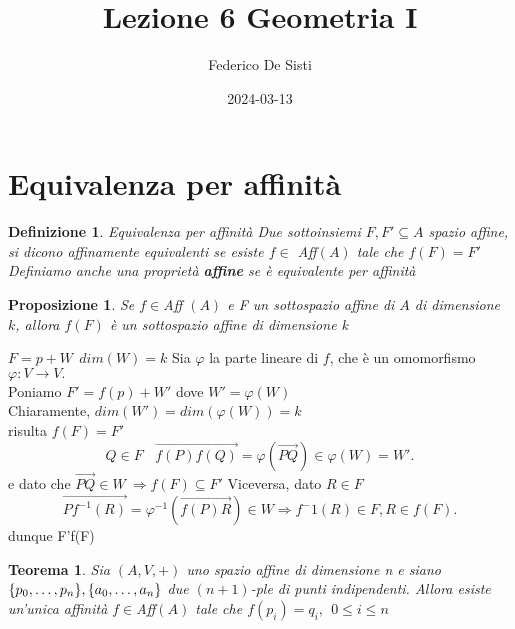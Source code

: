 \documentclass[12px]{article}
\title{Lezione 6 Geometria I}
\date{2024-03-13}
\author{Federico De Sisti}
\theoremstyle{break}
\newtheorem{theo}{Teorema}
\theoremstyle{break}
\theoremstyle{break}
\newtheorem{defin}{Definizione}
\theoremstyle{break}
\newtheorem{propo}{Proposizione}
\theoremstyle{break}
\newtheorem*{dimo}{Dimostrazione}
\theoremstyle{break}
\theoremstyle{break}
\newenvironment{dimo}
  {\begin{dimostrazione}}
  {\hfill\square\end{dimostrazione}}
\newenvironment{teo}
{\begin{mdframed}[linecolor=red, backgroundcolor=red!10]\begin{theo}}
  {\end{theo}\end{mdframed}}
\newenvironment{prop}
{\begin{mdframed}[linecolor=red, backgroundcolor=red!10]\begin{propo}}
  {\end{propo}\end{mdframed}}
\newenvironment{defi}
{\begin{mdframed}[linecolor=orange, backgroundcolor=orange!10]\begin{defin}}
  {\end{defin}\end{mdframed}}
\begin{document}
	\maketitle
	\newpage
	\section{Equivalenza per affinità}
	\begin{defi}{Equivalenza per affinità}{}
		Due sottoinsiemi $F, F'\subseteq A$ spazio affine, si dicono affinamente equivalenti se esiste $f\in$ Aff$(A)$ tale che $f(F) = F'$\\
		Definiamo anche una proprietà \textbf{affine} se è equivalente per affinità
	\end{defi}
	\begin{prop}{}{}
		Se $f\in$Aff $(A)$ e F un sottospazio affine di $A$ di dimensione $k$, allora $f(F)$ è un sottospazio affine di dimensione k
	\end{prop}
	\begin{dimo} 
		$F = p + W \ \ dim(W) = k$ Sia $\varphi$ la parte lineare di $f$, che è un omomorfismo $\varphi:V \rightarrow V.$\\
		Poniamo $F' = f(p) + W'$ dove $W' = \varphi(W)$\\
		Chiaramente, $dim(W') = dim(\varphi(W)) = k$ \\
		risulta $f(F) = F'$\\ \[
		Q\in F \ \ \ \ \overrightarrow{f(P)f(Q)} = \varphi(\overrightarrow{PQ})\in \varphi(W) = W'
		.\] 
		e dato che $ \overrightarrow{PQ}\in W \ \Rightarrow f(F)\subseteq F'$
		Viceversa, dato $R\in F$ 
		\[
			\overrightarrow{Pf^{-1}(R)} = \varphi^{-1}(\overrightarrow{f(P)R})\in W \Rightarrow  f^-1(R) \in F, R\in f(F)
		.\] 
		dunque F'\subseteq f(F)
	\end{dimo}
	\begin{teo}
		Sia $(A, V, +)$ uno spazio affine di dimensione n e siano $\{p_0,\ldots,p_n\}, \\ \{a_0,\ldots,a_n\}$ due $(n+1)$-ple di punti indipendenti. Allora esiste un'unica affinità $f\in$Aff$(A)$ tale che $f(p_i) = q_i, \ \ 0\leq i\leq n$
	\end{teo}
\end{document}
